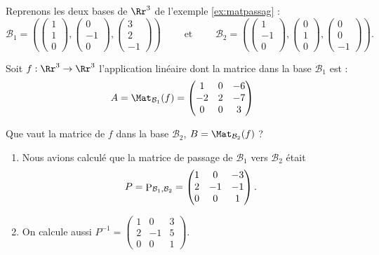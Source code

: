 \documentclass[class=report,crop=false]{standalone}
\begin{document}
\begin{exemple}
Reprenons les deux bases de $\Rr^3$ de l'exemple \ref{ex:matpassag} :
$$\mathcal{B}_1 =
\left(
\begin{pmatrix} 1\\1\\0\end{pmatrix},
\begin{pmatrix} 0 \\ -1 \\ 0\end{pmatrix},
\begin{pmatrix} 3\\2\\-1\end{pmatrix}
\right)
\qquad \text{ et } \qquad
\mathcal{B}_2 =
\left(
\begin{pmatrix} 1\\-1\\0\end{pmatrix},
\begin{pmatrix} 0 \\ 1 \\ 0\end{pmatrix},
\begin{pmatrix} 0\\0\\-1\end{pmatrix}
\right).$$


Soit $f : \Rr^3 \to \Rr^3$ l'application linéaire dont
la matrice dans la base $\mathcal{B}_1$ est :
$$A = \Mat_{\mathcal{B}_1}(f)
=\begin{pmatrix}
1 & 0 & -6\\
-2 & 2 & -7\\
0 & 0 & 3
\end{pmatrix}$$

Que vaut la matrice de $f$ dans la base $\mathcal{B}_2$, $B=\Mat_{\mathcal{B}_2}(f)$ ?

\begin{enumerate}
  \item Nous avions calculé que la matrice de passage de $\mathcal{B}_1$ vers $\mathcal{B}_2$
était
$$
P = \mathop{\mathrm{P}}\nolimits_{\mathcal{B}_1, \mathcal{B}_2} =
\begin{pmatrix}
1 & 0 & -3\\
2 & -1 & -1\\
0 & 0 & 1
\end{pmatrix}.$$

  \item On calcule aussi $P^{-1} =
\begin{pmatrix}
1 & 0 & 3\\
2 & -1 & 5\\
0 & 0 & 1
\end{pmatrix}.$


\end{enumerate}
\end{exemple}
\end{document}
